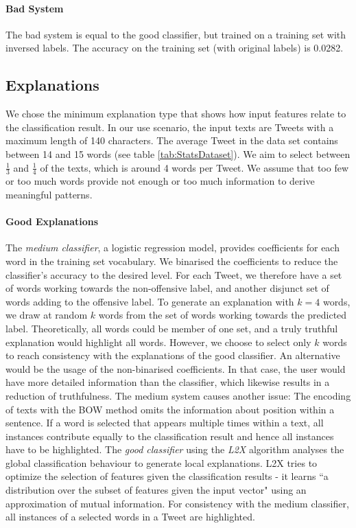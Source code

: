 \paragraph{Bad System}
The bad system is equal to the good classifier, but trained on a training set with inversed labels. The accuracy on the training set (with original labels) is 0.0282.



\subsection{Explanations} 
We chose the minimum explanation type that shows how input features relate to the classification result. In our use scenario, the input texts are Tweets with a maximum length of 140 characters. The average Tweet in the data set contains between 14 and 15 words (see table \ref{tab:StatsDataset}). We aim to select between $\frac{1}{3}$ and $\frac{1}{4}$ of the texts, which is around 4 words per Tweet. We assume that too few or too much words provide not enough or too much information to derive meaningful patterns. 


\paragraph{Good Explanations}
The \textit{medium classifier}, a logistic regression model, provides coefficients for each word in the training set vocabulary. We binarised the coefficients to reduce the classifier's accuracy to the desired level. For each Tweet, we therefore have a set of words working towards the non-offensive label, and another disjunct set of words adding to the offensive label. To generate an explanation with $k=4$ words, we draw at random $k$ words from the set of words working towards the predicted label. Theoretically, all words could be member of one set, and a truly truthful explanation would highlight all words. However, we choose to select only $k$ words to reach consistency with the explanations of the good classifier. An alternative would be the usage of the non-binarised coefficients. In that case, the user would have more detailed information than the classifier, which likewise results in a reduction of truthfulness. The medium system causes another issue: The encoding of texts with the BOW method omits the information about position within a sentence. If a word is selected that appears multiple times within a text, all instances contribute equally to the classification result and hence all instances have to be highlighted. The \textit{good classifier} using the \textit{L2X} algorithm analyses the global classification behaviour to generate local explanations. L2X tries to optimize the selection of features given the classification results - it learns ``a distribution over the subset of features given the input vector" \cite{chen2018learning} using an approximation of mutual information. For consistency with the medium classifier, all instances of a selected words in a Tweet are highlighted.

